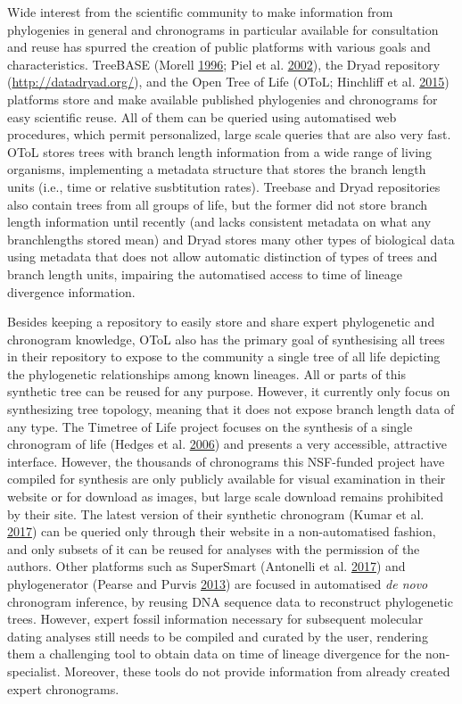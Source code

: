 \documentclass[]{article}
\begin{document}
Wide interest from the scientific community to make information from phylogenies in general and chronograms in particular available for consultation and reuse has spurred the creation of public platforms with various goals and characteristics. TreeBASE (Morell \protect\hyperlink{ref-morell1996roots}{1996}; Piel et al. \protect\hyperlink{ref-Piel2002}{2002}), the Dryad repository (\url{http://datadryad.org/}), and the Open Tree of Life (OToL; Hinchliff et al. \protect\hyperlink{ref-Hinchliff2015}{2015}) platforms store and make available published phylogenies and chronograms for easy scientific reuse. All of them can be queried using automatised web procedures, which permit personalized, large scale queries that are also very fast.
OToL stores trees with branch length information from a wide range of living organisms, implementing a metadata structure that stores the branch length units (i.e., time or relative susbtitution rates). Treebase and Dryad repositories also contain trees from all groups of life, but the former did not store branch length information until recently (and lacks consistent metadata on what any branchlengths stored mean) and Dryad stores many other types of biological data using metadata that does not allow automatic distinction of types of trees and branch length units, impairing the automatised access to time of lineage divergence information.

Besides keeping a repository to easily store and share expert phylogenetic and chronogram knowledge, OToL also has the primary goal of synthesising all trees in their repository to expose to the community a single tree of all life depicting the phylogenetic relationships among known lineages.
All or parts of this synthetic tree can be reused for any purpose. However, it currently only focus on synthesizing tree topology, meaning that it does not expose branch length data of any type.
The Timetree of Life project focuses on the synthesis of a single chronogram of life (Hedges et al. \protect\hyperlink{ref-Hedges2006}{2006}) and presents a very accessible, attractive interface. However, the thousands of chronograms this NSF-funded project have compiled for synthesis are only publicly available for visual examination in their website or for download as images, but large scale download remains prohibited by their site. The latest version of their synthetic chronogram (Kumar et al. \protect\hyperlink{ref-Kumar2017}{2017}) can be queried only through their website in a non-automatised fashion, and only subsets of it can be reused for analyses with the permission of the authors.
Other platforms such as SuperSmart (Antonelli et al. \protect\hyperlink{ref-antonelli2017supersmart}{2017}) and phylogenerator (Pearse and Purvis \protect\hyperlink{ref-pearse2013phylogenerator}{2013}) are focused in automatised \emph{de novo} chronogram inference, by reusing DNA sequence data to reconstruct phylogenetic trees. However, expert fossil information necessary for subsequent molecular dating analyses still needs to be compiled and curated by the user, rendering them a challenging tool to obtain data on time of lineage divergence for the non-specialist. Moreover, these tools do not provide information from already created expert chronograms.
\end{document}
